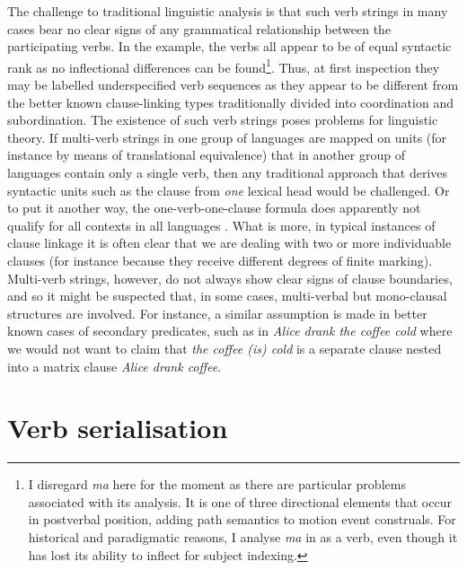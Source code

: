 The challenge to traditional linguistic analysis is that such verb strings in many cases bear no clear signs of any grammatical relationship between the participating verbs. In the example, the verbs all appear to be of equal syntactic rank as no inflectional differences can be found\footnote{I disregard \textit{ma} here for the moment as there are particular problems associated with its analysis. It is one of three directional elements that occur in postverbal position, adding path semantics to motion event construals. For historical and paradigmatic reasons, I analyse \textit{ma} in  as a verb, even though it has lost its ability to inflect for subject indexing.}. Thus, at first inspection they may be labelled underspecified verb sequences as they appear to be different from the better known clause-linking types traditionally divided into coordination and subordination. The existence of such verb strings poses problems for linguistic theory. If multi-verb strings in one group of languages are mapped on units (for instance by means of translational equivalence) that in another group of languages contain only a single verb, then any traditional approach that derives syntactic units such as the clause from \emph{one} lexical head would be challenged. Or to put it another way, the one-verb-one-clause formula does apparently not qualify for all contexts in all languages \citep{foley1985clausehood}. What is more, in typical instances of clause linkage it is often clear that we are dealing with two or more individuable clauses (for instance because they receive different degrees of finite marking). Multi-verb strings, however, do not always show clear signs of clause boundaries, and so it might be suspected that, in some cases,  multi-verbal but mono-clausal structures are involved. For instance, a similar assumption is made in better known cases of secondary predicates, such as in \textit{Alice drank the coffee cold} where we would not want to claim that \textit{the coffee (is) cold} is a separate clause nested into a matrix clause \textit{Alice drank coffee}.

\section{Verb serialisation}

